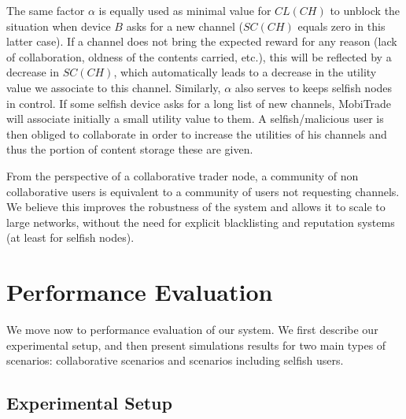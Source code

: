 The same factor $\alpha$ is equally used as minimal value for $CL(CH)$ to unblock the situation when device $B$ asks for a new channel ($SC(CH)$ equals zero in this latter case). If a channel does not bring the expected reward for any reason (lack of collaboration, oldness of the contents carried, etc.), this will be reflected by a decrease in $SC(CH)$, which automatically leads to a decrease in the utility value we associate to this channel. Similarly, $\alpha$ also serves to keeps selfish nodes in control. If some selfish device asks for a long list of new channels, MobiTrade will associate initially a small utility value to them. A selfish/malicious user is then obliged to collaborate in order to increase the utilities of his channels and thus the portion of content storage these are given.

From the perspective of a collaborative trader node, a community of non collaborative users is equivalent to a community of users not requesting channels. We believe this improves the robustness of the system and allows it to scale to large networks, without the need for explicit blacklisting and reputation systems (at least for selfish nodes).


\section{Performance Evaluation}
\label{performance-evaluation}

We move now to performance evaluation of our system. We first describe our experimental setup, and then present simulations results for two main types of scenarios: collaborative scenarios and scenarios including selfish users.

\subsection{Experimental Setup}
\label{experimental-setup}


